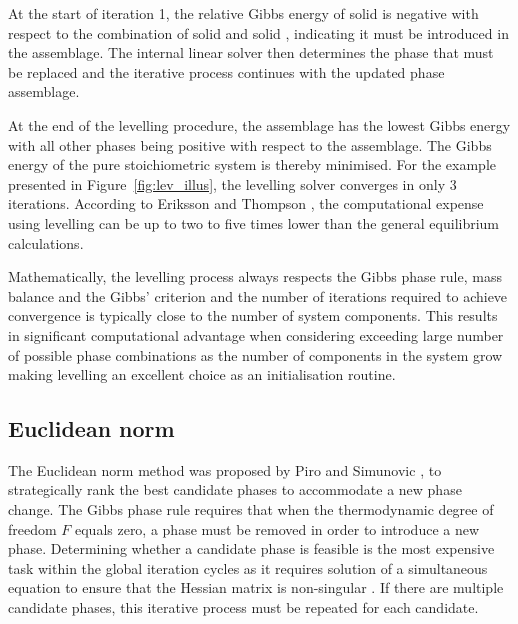 	At the start of iteration 1, the relative Gibbs energy of solid  is negative with respect to the combination of solid  and solid , indicating it must be introduced in the assemblage. The internal linear solver then determines the phase that must be replaced and the iterative process continues with the updated phase assemblage.

	At the end of the levelling procedure, the assemblage has the lowest Gibbs energy with all other phases being positive with respect to the assemblage. The Gibbs energy of the pure stoichiometric system is thereby minimised. For the example presented in Figure~\ref{fig:lev_illus}, the levelling solver converges in only 3 iterations. According to Eriksson and Thompson \cite{Eriksson89}, the computational expense using levelling can be up to two to five times lower than the general equilibrium calculations.

	Mathematically, the levelling  process always respects the Gibbs phase rule, mass balance and the Gibbs' criterion and the number of iterations required to achieve convergence is typically close to the number of system components. This results in significant computational advantage when considering exceeding large number of possible phase combinations as the number of components in the system grow making levelling an excellent choice as an initialisation routine.

\subsection{Euclidean norm} \label{sec:Euclidean}
	The Euclidean norm method was proposed by Piro and Simunovic \cite{Piro12a}, to strategically rank the best candidate phases to accommodate a new phase change. The Gibbs phase rule requires that when the thermodynamic degree of freedom $F$ equals zero, a phase must be removed in order to introduce a new phase. Determining whether a candidate phase is feasible is the most expensive task within the global iteration cycles as it requires solution of a simultaneous equation to ensure that the Hessian matrix is non-singular \cite{Piro12a}. If there are multiple candidate phases, this iterative process must be repeated for each candidate.

